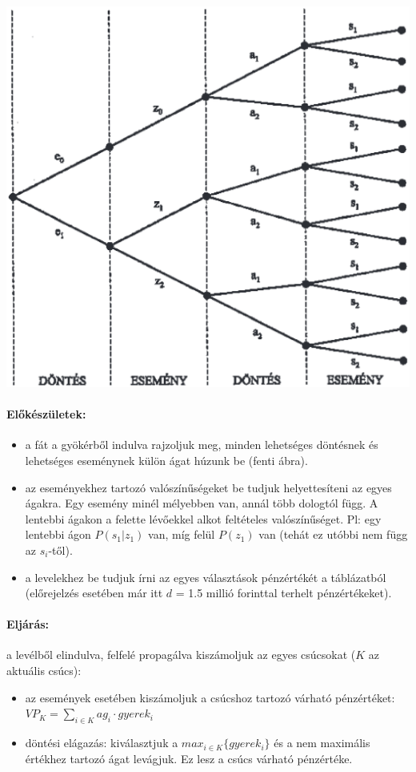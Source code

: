 \documentclass[a4paper,12pt]{article}
\begin{document}
\begin{center}

\includegraphics[scale=0.7]{dectree01}
\\
\end{center}

\paragraph{Előkészületek: }
\begin{itemize}
\item a fát a gyökérből indulva rajzoljuk meg, minden lehetséges döntésnek és lehetséges eseménynek külön ágat húzunk be (fenti ábra).
\item az eseményekhez tartozó valószínűségeket be tudjuk helyettesíteni az egyes ágakra. Egy esemény minél mélyebben van, annál több dologtól függ. A lentebbi ágakon a felette lévőekkel alkot feltételes valószínűséget. Pl: egy lentebbi ágon $P(s_1|z_1)$ van, míg felül $P(z_1)$ van (tehát ez utóbbi nem függ az $s_i$-től).
\item a levelekhez be tudjuk írni az egyes választások pénzértékét a táblázatból (előrejelzés esetében már itt $d$ = 1.5 millió forinttal terhelt pénzértékeket).
\end{itemize}

\paragraph{Eljárás: }
a levélből elindulva, felfelé propagálva kiszámoljuk az egyes csúcsokat ($K$ az aktuális csúcs):
\begin{itemize}
\item az események esetében kiszámoljuk a csúcshoz tartozó várható pénzértéket: \\
 $VP_K = \sum_{i\in K} ag_i\cdot gyerek_i$ 
\item döntési elágazás: kiválasztjuk a $max_{i\in K}\{gyerek_i\}$ és a nem maximális értékhez tartozó ágat levágjuk. Ez lesz a csúcs várható pénzértéke.
\end{itemize}
\end{document}

